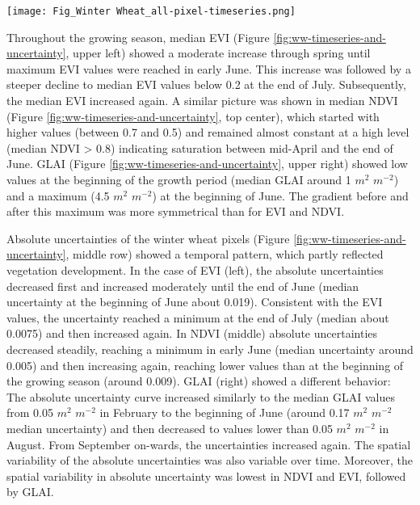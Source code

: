 \begin{figure*}
    \centering
    \texttt{[image: Fig\_Winter Wheat\_all-pixel-timeseries.png]}
    \caption{Spatio-temporal variability of \gls{EVI} (left column), \gls{NDVI} (mid column) and \gls{GLAI} (right column) for all pixels annotated as winter wheat (228.8 ha). For each \gls{S2} scene, the median value (blue line), central 50\% (red) and 90\% spread (orange) across all pixels is shown not classified as cloud, shadow or snow based on the \gls{SCL} data of the original \gls{S2} outputs after Sen2Cor. The top-row shows the spatio-temporal variability in the actual EVI, \gls{NDVI} and \gls{GLAI} derived from the \gls{S2} scenes. In the mid row, the absolute uncertainties derived from the  \gls{MC} simulations are depicted. The bottom row shows the uncertainties in relative terms.}
    \label{fig:ww-timeseries-and-uncertainty}
\end{figure*}

Throughout the growing season, median \gls{EVI} (Figure \ref{fig:ww-timeseries-and-uncertainty}, upper left) showed a moderate increase through spring until maximum \gls{EVI} values were reached in early June. This increase was followed by a steeper decline to median \gls{EVI} values below 0.2 at the end of July. Subsequently, the median \gls{EVI} increased again. A similar picture was shown in median \gls{NDVI} (Figure \ref{fig:ww-timeseries-and-uncertainty}, top center), which started with higher values (between 0.7 and 0.5) and remained almost constant at a high level (median \gls{NDVI} > 0.8) indicating saturation between mid-April and the end of June. \gls{GLAI} (Figure \ref{fig:ww-timeseries-and-uncertainty}, upper right) showed low values at the beginning of the growth period (median \gls{GLAI} around 1 $m^2$ $m^{-2}$) and a maximum (4.5  $m^2$ $m^{-2}$) at the beginning of June. The gradient before and after this maximum was more symmetrical than for \gls{EVI} and NDVI.

Absolute uncertainties of the winter wheat pixels (Figure \ref{fig:ww-timeseries-and-uncertainty}, middle row) showed a temporal pattern, which partly reflected vegetation development. In the case of \gls{EVI} (left), the absolute uncertainties decreased first and increased moderately until the end of June (median uncertainty at the beginning of June about 0.019). Consistent with the \gls{EVI} values, the uncertainty reached a minimum at the end of July (median about 0.0075) and then increased again. In \gls{NDVI} (middle) absolute uncertainties decreased steadily, reaching a minimum in early June (median uncertainty around 0.005) and then increasing again, reaching lower values than at the beginning of the growing season (around 0.009). \gls{GLAI} (right) showed a different behavior: The absolute uncertainty curve increased similarly to the median \gls{GLAI} values from 0.05  $m^2$ $m^{-2}$ in February to the beginning of June (around 0.17  $m^2$ $m^{-2}$ median uncertainty) and then decreased to values lower than 0.05  $m^2$ $m^{-2}$ in August. From September on-wards, the uncertainties increased again. The spatial variability of the absolute uncertainties was also variable over time. Moreover, the spatial variability in absolute uncertainty was lowest in \gls{NDVI} and EVI, followed by GLAI.

